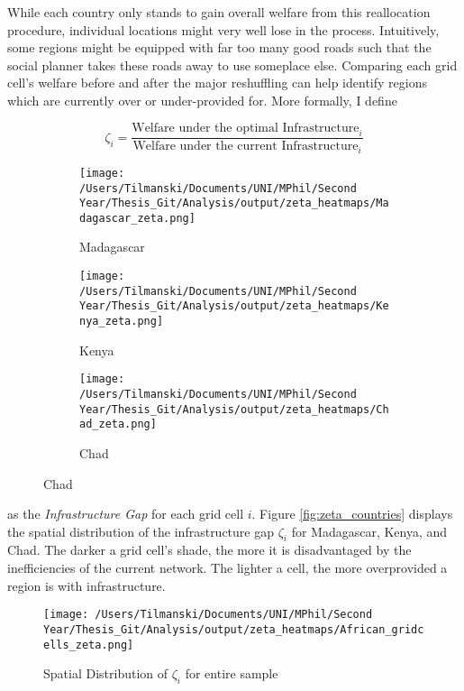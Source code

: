 \documentclass[11pt, oneside]{article}   	%
\begin{document}
While each country only stands to gain overall welfare from this reallocation procedure, individual locations might very well lose in the process. Intuitively, some regions might be equipped with far too many good roads such that the social planner takes these roads away to use someplace else. Comparing each grid cell's welfare before and after the major reshuffling can help identify regions which are currently over or under-provided for. More formally, I define

\begin{equation}
  \zeta_{i} = \frac{\textrm{Welfare under the optimal Infrastructure}_{i}}{\textrm{Welfare under the current Infrastructure}_{i}}
\end{equation}

\begin{figure}
\centering
\caption{Spatial Distribution of $\zeta_{i}$ for sample countries}

\begin{subfigure}[c]{0.32\textwidth}
\texttt{[image: /Users/Tilmanski/Documents/UNI/MPhil/Second Year/Thesis\_Git/Analysis/output/zeta\_heatmaps/Madagascar\_zeta.png]}
\caption{Madagascar}
\label{fig:Madagascar_zeta}
\end{subfigure}
\begin{subfigure}[c]{0.32\textwidth}
\texttt{[image: /Users/Tilmanski/Documents/UNI/MPhil/Second Year/Thesis\_Git/Analysis/output/zeta\_heatmaps/Kenya\_zeta.png]}
\caption{Kenya}
\label{fig:Kenya_zeta}
\end{subfigure}
\begin{subfigure}[c]{0.32\textwidth}
\texttt{[image: /Users/Tilmanski/Documents/UNI/MPhil/Second Year/Thesis\_Git/Analysis/output/zeta\_heatmaps/Chad\_zeta.png]}
\caption{Chad}
\label{fig:Chad_zeta}
\end{subfigure}
\label{fig:zeta_countries}
\end{figure}

as the \emph{Infrastructure Gap} for each grid cell $i$. Figure \eqref{fig:zeta_countries} displays the spatial distribution of the infrastructure gap $\zeta_{i}$ for Madagascar, Kenya, and Chad. The darker a grid cell's shade, the more it is disadvantaged by the inefficiencies of the current network. The lighter a cell, the more overprovided a region is with infrastructure.

\begin{figure}
\centering
\caption{Spatial Distribution of $\zeta_{i}$ for entire sample}
\texttt{[image: /Users/Tilmanski/Documents/UNI/MPhil/Second Year/Thesis\_Git/Analysis/output/zeta\_heatmaps/African\_gridcells\_zeta.png]}

\label{fig:all_gridcells_by_zeta}
\end{figure}
\end{document}
